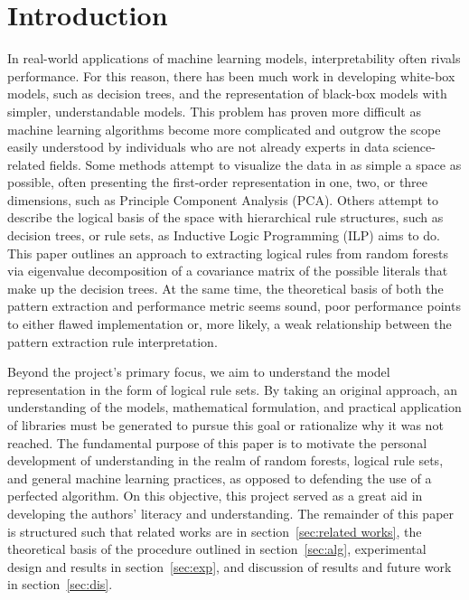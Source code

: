 \documentclass[11pt]{article}
\begin{document}
\section{Introduction}
\label{sec:intro}
In real-world applications of machine learning models, interpretability often rivals performance. For this reason, there has been much work in developing white-box models, such as decision trees, and the representation of black-box models with simpler, understandable models. This problem has proven more difficult as machine learning algorithms become more complicated and outgrow the scope easily understood by individuals who are not already experts in data science-related fields. Some methods attempt to visualize the data in as simple a space as possible, often presenting the first-order representation in one, two, or three dimensions, such as Principle Component Analysis (PCA). Others attempt to describe the logical basis of the space with hierarchical rule structures, such as decision trees, or rule sets, as Inductive Logic Programming (ILP) aims to do. This paper outlines an approach to extracting logical rules from random forests via eigenvalue decomposition of a covariance matrix of the possible literals that make up the decision trees. At the same time, the theoretical basis of both the pattern extraction and performance metric seems sound, poor performance points to either flawed implementation or, more likely, a weak relationship between the pattern extraction rule interpretation.

Beyond the project's primary focus, we aim to understand the model representation in the form of logical rule sets. By taking an original approach, an understanding of the models, mathematical formulation, and practical application of libraries must be generated to pursue this goal or rationalize why it was not reached. The fundamental purpose of this paper is to motivate the personal development of understanding in the realm of random forests, logical rule sets, and general machine learning practices, as opposed to defending the use of a perfected algorithm. On this objective, this project served as a great aid in developing the authors' literacy and understanding. The remainder of this paper is structured such that related works are in section~\ref{sec:related works}, the theoretical basis of the procedure outlined in section~\ref{sec:alg}, experimental design and results in section~\ref{sec:exp}, and discussion of results and future work in section~\ref{sec:dis}.


\end{document}
